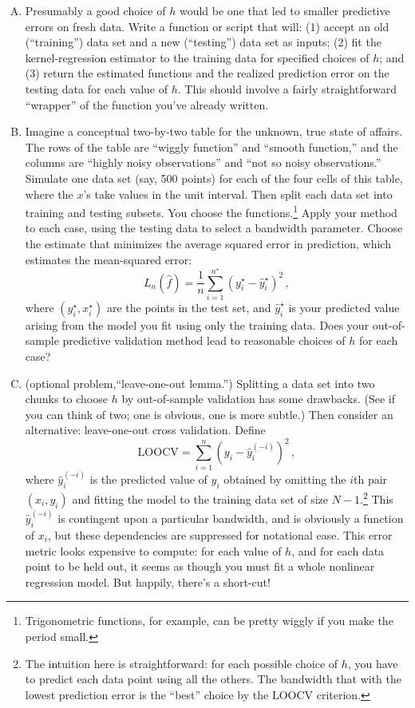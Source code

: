 \documentclass[11pt]{article}
\begin{document}
\begin{enumerate}[(A)]


\item  Presumably a good choice of $h$ would be one that led to smaller predictive errors on fresh data.  Write a function or script that will: (1) accept an old (``training'') data set and a new (``testing'') data set as inputs; (2) fit the kernel-regression estimator to the training data for specified choices of $h$; and (3) return the estimated functions and the realized prediction error on the testing data for each value of $h$.  This should involve a fairly straightforward ``wrapper'' of the function you've already written.

\item Imagine a conceptual two-by-two table for the unknown, true state of affairs.  The rows of the table are ``wiggly function'' and ``smooth function,'' and the columns are ``highly noisy observations'' and ``not so noisy observations.''  Simulate one data set (say, 500 points) for each of the four cells of this table, where the $x$'s take values in the unit interval.  Then split each data set into training and testing subsets.  You choose the functions.\footnote{Trigonometric functions, for example, can be pretty wiggly if you make the period small.}   Apply your method to each case, using the testing data to select a bandwidth parameter.  Choose the estimate that minimizes the average squared error in prediction, which estimates the mean-squared error:
$$
L_n(\hat{f}) = \frac{1}{n}\sum_{i=1}^{n^{\star}} (y^{\star}_i - \hat{y}_i^{\star} )^2 \, ,
$$
where $(y_i^{\star}, x_i^{\star})$ are the points in the test set, and $ \hat{y}_i^{\star}$ is your predicted value arising from the model you fit using only the training data.  Does your out-of-sample predictive validation method lead to reasonable choices of $h$ for each case?

\item (optional problem,``leave-one-out lemma.'') Splitting a data set into two chunks to choose $h$ by out-of-sample validation has some drawbacks.  (See if you can think of two; one is obvious, one is more subtle.)  Then consider an alternative: leave-one-out cross validation.  Define
$$
\mbox{LOOCV} = \sum_{i=1}^n \left( y_i - \hat{y}_{i}^{(-i)} \right)^2 \, ,
$$
where $\hat{y}_{i}^{(-i)} $ is the predicted value of $y_i$ obtained by omitting the $i$th pair $(x_i, y_i)$ and fitting the model to the training data set of size $N-1$.\footnote{The intuition here is straightforward: for each possible choice of $h$, you have to predict each data point using all the others.  The bandwidth that with the lowest prediction error is the ``best'' choice by the LOOCV criterion.}  This $\hat{y}_{i}^{(-i)}$ is contingent upon a particular bandwidth, and is obviously a function of $x_i$, but these dependencies are suppressed for notational ease.  This error metric looks expensive to compute: for each value of $h$, and for each data point to be held out, it seems as though you must fit a whole nonlinear regression model.  But happily, there's a short-cut!


\end{enumerate}
\end{document}
